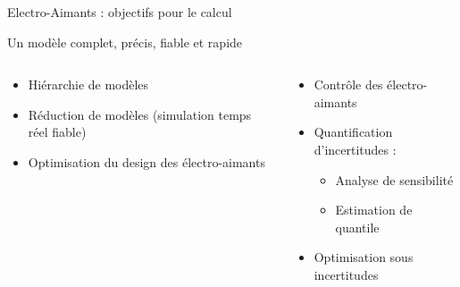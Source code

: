 \begin{frame}{Electro-Aimants : objectifs pour le calcul}
  \begin{block}{Un modèle complet, précis, fiable et rapide}
    \vspace*{-0.3cm}
    \begin{columns}[c]
      \begin{small}
        \begin{itemize}
        \item Hiérarchie de modèles
        \item Réduction de modèles (simulation temps réel fiable)
        \item Optimisation du design des électro-aimants
        \end{itemize}
      \end{small}
      \begin{small}
        \begin{itemize}
        \item Contrôle  des électro-aimants
        \item Quantification d'incertitudes :
          \begin{itemize}
          \item Analyse de sensibilité
          \item Estimation de quantile
          \end{itemize}
        \item Optimisation sous incertitudes
        \end{itemize}
      \end{small}
    \end{columns}
  \end{block}
  

\end{frame}
